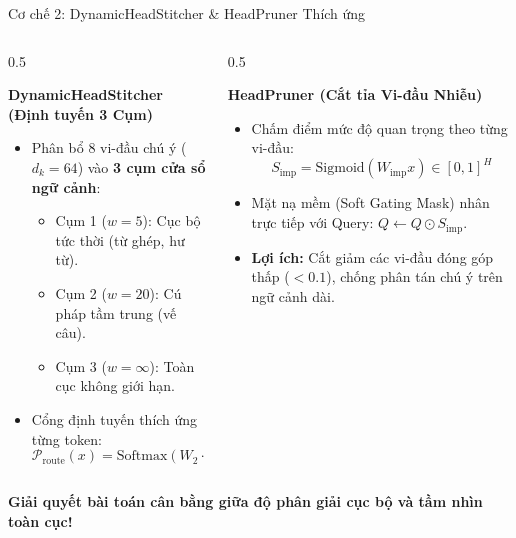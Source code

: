 \documentclass[aspectratio=169, 10pt]{beamer}
\begin{document}
\begin{frame}{Cơ chế 2: DynamicHeadStitcher \& HeadPruner Thích ứng}
  \begin{columns}
    \begin{column}{0.5\textwidth}
      \begin{block}{\textbf{DynamicHeadStitcher (Định tuyến 3 Cụm)}}
        \begin{itemize}
          \item Phân bổ 8 vi-đầu chú ý ($d_k=64$) vào \textbf{3 cụm cửa sổ ngữ cảnh}:
            \begin{itemize}
              \item Cụm 1 ($w=5$): Cục bộ tức thời (từ ghép, hư từ).
              \item Cụm 2 ($w=20$): Cú pháp tầm trung (vế câu).
              \item Cụm 3 ($w=\infty$): Toàn cục không giới hạn.
            \end{itemize}
          \item Cổng định tuyến thích ứng từng token:
            $$\mathcal{P}_{\text{route}}(x) = \text{Softmax}(W_2 \cdot \text{GELU}(W_1 x))$$
        \end{itemize}
      \end{block}
    \end{column}
    \begin{column}{0.5\textwidth}
      \begin{block}{\textbf{HeadPruner (Cắt tỉa Vi-đầu Nhiễu)}}
        \begin{itemize}
          \item Chấm điểm mức độ quan trọng theo từng vi-đầu:
            $$S_{\text{imp}} = \text{Sigmoid}(W_{\text{imp}} x) \in [0, 1]^H$$
          \item Mặt nạ mềm (Soft Gating Mask) nhân trực tiếp với Query: $Q \leftarrow Q \odot S_{\text{imp}}$.
          \item \textbf{Lợi ích:} Cắt giảm các vi-đầu đóng góp thấp ($<0.1$), chống phân tán chú ý trên ngữ cảnh dài.
        \end{itemize}
      \end{block}
    \end{column}
  \end{columns}
  \vspace{0.3cm}
  \centering
  \textbf{\color{AccentGreen}Giải quyết bài toán cân bằng giữa độ phân giải cục bộ và tầm nhìn toàn cục!}
\end{frame}
\end{document}
